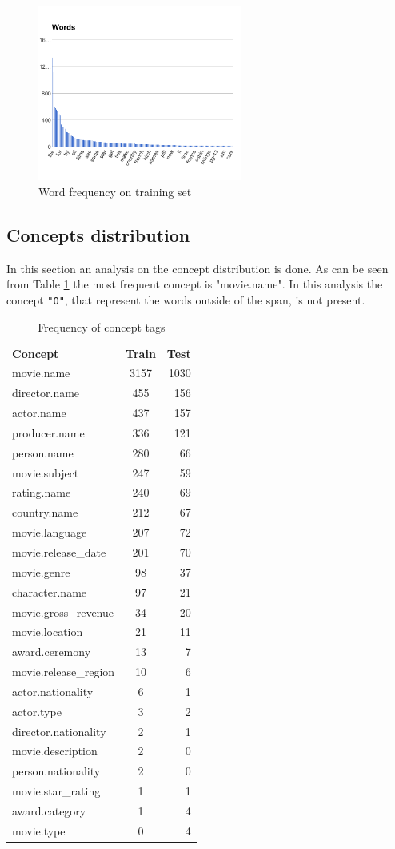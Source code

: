 \documentclass[11pt,a4paper]{article}
\begin{document}
\begin{figure}[h]
    \centering
    \includegraphics[width=0.6\textwidth]{image.png}
    \caption{Word frequency on training set}
    \label{wordFrequency}
\end{figure}
\subsection{Concepts distribution}
    In this section an analysis on the concept distribution is done. As can be seen from Table \ref{table} the most frequent concept is "movie.name". In this analysis the concept \texttt{"O"}, that represent the words outside of the span, is not present.
\begin{table}[h]
\centering
\begin{tabular}{l|c|r}
{\bf Concept} & {\bf Train} & {\bf Test} \\
movie.name & 3157 & 1030 \\
director.name & 455 & 156 \\
actor.name & 437 & 157 \\
producer.name & 336 & 121 \\
person.name & 280 & 66 \\
movie.subject & 247 & 59 \\
rating.name & 240 & 69 \\
country.name & 212 & 67 \\
movie.language & 207 & 72 \\
movie.release\_date & 201 & 70 \\
movie.genre & 98 & 37 \\
character.name & 97 & 21 \\
movie.gross\_revenue & 34 & 20 \\
movie.location & 21 & 11 \\
award.ceremony & 13 & 7 \\
movie.release\_region & 10 & 6  \\
actor.nationality & 6 & 1 \\
actor.type & 3 & 2 \\
director.nationality & 2 & 1 \\
movie.description & 2 & 0 \\
person.nationality & 2 & 0 \\
movie.star\_rating & 1 & 1 \\
award.category & 1 & 4 \\
movie.type & 0 & 4
\end{tabular}
\caption{Frequency of concept tags}
\label{table}
\end{table}
\end{document}
